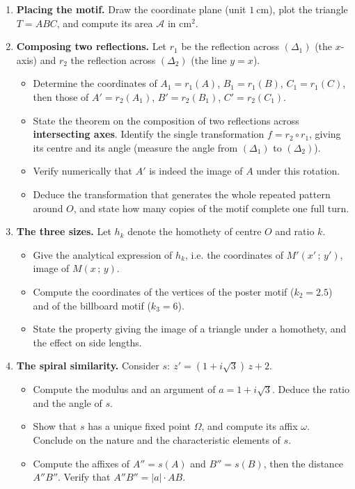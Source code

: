 \documentclass[11pt]{article}
\begin{document}
\begin{enumerate}
\item \textbf{Placing the motif.} Draw the coordinate plane (unit $1\ \mathrm{cm}$), plot the triangle $T = ABC$, and compute its area $\mathcal{A}$ in $\mathrm{cm}^2$.
\item \textbf{Composing two reflections.} Let $r_1$ be the reflection across $(\Delta_1)$ (the $x$-axis) and $r_2$ the reflection across $(\Delta_2)$ (the line $y = x$).
\begin{itemize}
\item Determine the coordinates of $A_1 = r_1(A)$, $B_1 = r_1(B)$, $C_1 = r_1(C)$, then those of $A' = r_2(A_1)$, $B' = r_2(B_1)$, $C' = r_2(C_1)$.
\item State the theorem on the composition of two reflections across \textbf{intersecting axes}. Identify the single transformation $f = r_2 \circ r_1$, giving its centre and its angle (measure the angle from $(\Delta_1)$ to $(\Delta_2)$).
\item Verify numerically that $A'$ is indeed the image of $A$ under this rotation.
\item Deduce the transformation that generates the whole repeated pattern around $O$, and state how many copies of the motif complete one full turn.
\end{itemize}
\item \textbf{The three sizes.} Let $h_k$ denote the homothety of centre $O$ and ratio $k$.
\begin{itemize}
\item Give the analytical expression of $h_k$, i.e. the coordinates of $M'(x'\,;\,y')$, image of $M(x\,;\,y)$.
\item Compute the coordinates of the vertices of the poster motif ($k_2 = 2.5$) and of the billboard motif ($k_3 = 6$).
\item State the property giving the image of a triangle under a homothety, and the effect on side lengths.
\end{itemize}
\item \textbf{The spiral similarity.} Consider $s:\ z' = (1 + i\sqrt{3})\,z + 2$.
\begin{itemize}
\item Compute the modulus and an argument of $a = 1 + i\sqrt{3}$. Deduce the ratio and the angle of $s$.
\item Show that $s$ has a unique fixed point $\Omega$, and compute its affix $\omega$. Conclude on the nature and the characteristic elements of $s$.
\item Compute the affixes of $A'' = s(A)$ and $B'' = s(B)$, then the distance $A''B''$. Verify that $A''B'' = |a| \cdot AB$.

\end{itemize}
\end{enumerate}
\end{document}
